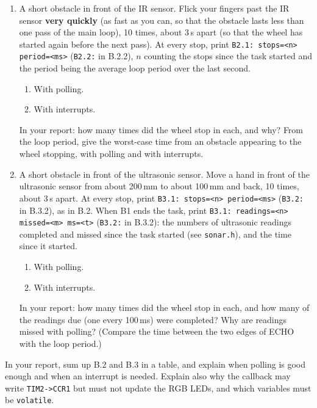 \documentclass[11pt,a4paper]{article}
\begin{document}
\begin{enumerate}[label=B.\arabic*, leftmargin=2.2em, start=2]
  \item A short obstacle in front of the IR sensor. Flick your fingers past the IR sensor \textbf{very quickly} (as
        fast as you can, so that the obstacle lasts less than one pass of the main loop), 10 times, about 3\,s apart
        (so that the wheel has started again before the next pass). At every stop, print
        \texttt{B2.1: stops=<n> period=<ms>} (\texttt{B2.2:} in B.2.2), $n$ counting the stops since the task
        started and the period being the average loop period over the last second.
        \begin{enumerate}[label=B.2.\arabic*, leftmargin=3.2em]
          \item With polling.
          \item With interrupts.
        \end{enumerate}
        In your report: how many times did the wheel stop in each, and why? From the loop period, give the
        worst-case time from an obstacle appearing to the wheel stopping, with polling and with interrupts.
  \item A short obstacle in front of the ultrasonic sensor. Move a hand in front of the
        ultrasonic sensor from about 200\,mm to about 100\,mm and back, 10 times, about 3\,s apart. At every stop,
        print \texttt{B3.1: stops=<n> period=<ms>} (\texttt{B3.2:} in B.3.2), as in B.2. When B1 ends the task, print
        \texttt{B3.1: readings=<n> missed=<m> ms=<t>} (\texttt{B3.2:} in B.3.2): the numbers of ultrasonic
        readings completed and missed since the task started (see \texttt{sonar.h}), and the time since it started.
        \begin{enumerate}[label=B.3.\arabic*, leftmargin=3.2em]
          \item With polling.
          \item With interrupts.
        \end{enumerate}
        In your report: how many times did the wheel stop in each, and how many of the readings due (one every 100\,ms) were completed?
        Why are readings missed with polling? (Compare the time between the two edges of ECHO with the loop
        period.)
\end{enumerate}
In your report, sum up B.2 and B.3 in a table, and explain when polling is good enough and when an interrupt is
needed. Explain also why the callback may write \texttt{TIM2->CCR1} but must not update the RGB LEDs, and which
variables must be \texttt{volatile}.
\end{document}
